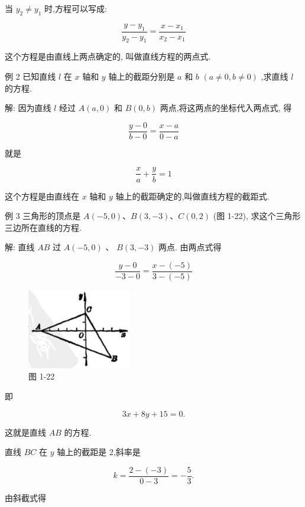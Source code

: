 \documentclass[lang=cn,newtx,10pt,scheme=chinese]{elegantbook}
\begin{document}
当 \({y}_{2} \neq {y}_{1}\) 时,方程可以写成:

\[
  \frac{y - {y}_{1}}{{y}_{2} - {y}_{1}} = \frac{x - {x}_{1}}{{x}_{2} - {x}_{1}}
\]

这个方程是由直线上两点确定的, 叫做直线方程的两点式.

例 2 已知直线 \(l\) 在 \(x\) 轴和 \(y\) 轴上的截距分别是 \(a\) 和 \(b\) \(\left( {a \neq 0,b \neq 0}\right)\) ,求直线 \(l\) 的方程.

解: 因为直线 \(l\) 经过 \(A\left( {a,0}\right)\) 和 \(B\left( {0,b}\right)\) 两点,将这两点的坐标代入两点式, 得

\[
  \frac{y - 0}{b - 0} = \frac{x - a}{0 - a}
\]

就是

\[
  \frac{x}{a} + \frac{y}{b} = 1
\]

这个方程是由直线在 \(x\) 轴和 \(y\) 轴上的截距确定的,叫做直线方程的截距式.

例 3 三角形的顶点是 \(A\left( {-5,0}\right) \text{、}B\left( {3, - 3}\right) \text{、}C\left( {0,2}\right)\) (图 1-22), 求这个三角形三边所在直线的方程.

解: 直线 \({AB}\) 过 \(A\left( {-5,0}\right)\) 、 \(B\left( {3, - 3}\right)\) 两点. 由两点式得

\[
  \frac{y - 0}{-3 - 0} = \frac{x - \left( {-5}\right) }{3 - \left( {-5}\right) }
\]

\begin{figure}[h]
  \centering
  \includegraphics[max width=0.4\textwidth]{images/01912cc2-ffb6-728e-9ae7-b113ff05c64b_26_981074.jpg}
  \caption{图 1-22}
\end{figure}



即

\[
    {3x} + {8y} + {15} = 0.
\]

这就是直线 \({AB}\) 的方程.

直线 \({BC}\) 在 \(y\) 轴上的截距是 2,斜率是

\[
  k = \frac{2 - \left( {-3}\right) }{0 - 3} = - \frac{5}{3}.
\]

由斜截式得
\end{document}
